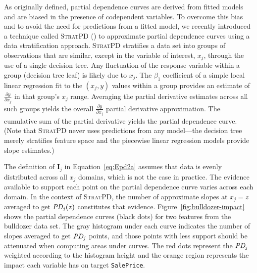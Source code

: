 \documentclass[12pt]{article}
\newcommand{\figref}[1]{Figure~\ref{#1}}
\newcommand{\eqnref}[1]{Equation~\ref{#1}}
\newcommand{\Imp}{\mathbf{I}}
\newcommand{\spd}{\fontfamily{cmr}\textsc{\small StratPD}}
\begin{document}
As originally defined, partial dependence curves are derived from fitted models and are biased in the presence of codependent variables.  To overcome this bias and to avoid the need for predictions from a fitted model, we recently introduced a technique called \spd{} (\cite{stratpd}) to approximate partial dependence curves using a data stratification approach. \spd{} stratifies a data set into groups of observations that are similar, except in the variable of interest, $x_j$, through the use of a single decision tree. Any fluctuation of the response variable within a group (decision tree leaf) is likely due to $x_j$. The $\beta_1$ coefficient of a simple local linear regression fit to the $(x_j, y)$ values within a group provides an estimate of $\frac{\partial y}{\partial x_j}$ in that group's $x_j$ range. Averaging the partial derivative estimates across all such groups yields the overall $\frac{\partial y}{\partial x_j}$ partial derivative approximation. The cumulative sum of the partial derivative yields the partial dependence curve. (Note that \spd{} never uses predictions from any model---the decision tree merely stratifies feature space and the piecewise linear regression models provide slope estimates.)

The definition of $\Imp_j$ in \eqnref{eq:Epd2a} assumes that data is evenly distributed across all $x_j$ domains, which is not the case in practice. The evidence available to support each point on the partial dependence curve varies across each domain. In the context of \spd, the number of approximate slopes at $x_j=z$ averaged to get $\text{\it PD}_j(z)$ constitutes that evidence. \figref{fig:bulldozer-impact} shows the partial dependence curves (black dots) for two features from the bulldozer data set. The gray histogram under each curve indicates the number of slopes averaged to get $\text{\it PD}_j$ points, and those points with less support should be attenuated when computing areas under curves. The red dots represent the $\text{\it PD}_j$ weighted according to the histogram height and the orange region represents the impact each variable has on target {\tt\small SalePrice}.
\end{document}
